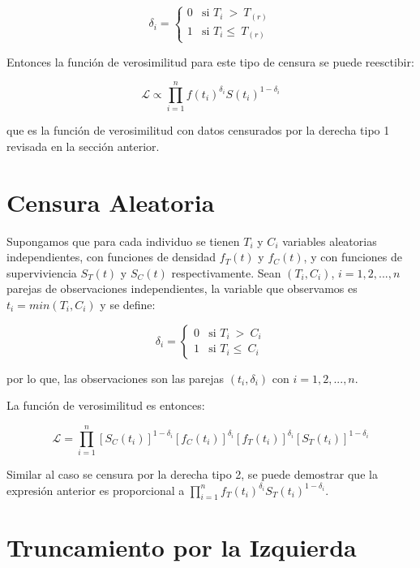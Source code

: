 \documentclass[
  a4paper,
  oneside,
  openany]{book}
\begin{document}
\[
\delta_{i} = \left\{
\begin{array}{ll}
0 & \mbox{si  } T_{i} \ > \ T_{(r)}\\
1 & \mbox{si }  T_{i}  \leq\ T_{(r)}
\end{array}
\right.
\]

Entonces la función de verosimilitud para este tipo de censura se puede reesctibir:

\[ 
\mathscr{L} \propto \prod^{n}_{i=1}f(t_{i})^{\delta_{i}}S(t_{i})^{1-\delta_{i}} 
\]

que es la función de verosimilitud con datos censurados por la derecha tipo 1 revisada en la sección anterior.

\hypertarget{censura-aleatoria}{%
\section{Censura Aleatoria}\label{censura-aleatoria}}

Supongamos que para cada individuo se tienen \(T_i\) y \(C_i\) variables aleatorias independientes, con funciones de densidad \(f_{T}(t)\) y \(f_{C}(t)\), y con funciones de superviviencia \(S_{T}(t)\) y \(S_{C}(t)\) respectivamente. Sean \((T_i,C_i)\), \(i=1,2,...,n\) parejas de observaciones independientes, la variable que observamos es \(t_i=min(T_i,C_i)\) y se define:

\[
\delta_{i} = \left\{
\begin{array}{ll}
0 & \mbox{si  } T_{i} \ > \ C_i\\
1 & \mbox{si }  T_{i}  \leq\ C_i
\end{array}
\right.
\]

por lo que, las observaciones son las parejas \((t_i,\delta_i)\) con \(i=1,2,...,n\).

La función de verosimilitud es entonces:

\[ 
\mathscr{L} = \prod^{n}_{i=1}[S_C(t_{i})]^{1-\delta_{i}}[f_C(t_i)]^{\delta_i}[f_T(t_i)]^{\delta_i}[S_T(t_{i})]^{1-\delta_{i}} 
\]

Similar al caso se censura por la derecha tipo 2, se puede demostrar que la expresión anterior es proporcional a \(\prod^{n}_{i=1}f_T(t_{i})^{\delta_{i}}S_T(t_{i})^{1-\delta_{i}}\).

\hypertarget{truncamiento-por-la-izquierda}{%
\section{Truncamiento por la Izquierda}\label{truncamiento-por-la-izquierda}}
\end{document}
